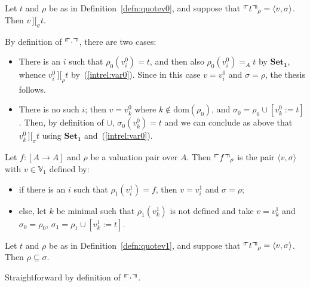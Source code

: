 \documentclass[numreferences]{kluwer}
\newcommand{\intII}{\,]\![}
\newcommand{\intrel}{\mathbin{\intII_{\rho}}}
\newcommand{\V}{{\mathbb V}}
\newcommand{\axiom}[1]{\ensuremath{\mathbf{#1}}}
\newcommand{\mlfnv}[2]{\ensuremath\ulcorner\!\!\ulcorner{#1}\urcorner\!\!\urcorner_{#2}}
\newcommand{\domain}{\ensuremath{\mathrm{dom}}}
\newcommand{\intrels}{\mathbin{\intII_{\sigma}}}
\begin{document}
\begin{article}
\begin{lemma}\label{quotev0corr}
Let $t$ and $\rho$ be as in Definition~\ref{defn:quotev0}, and suppose
that $\mlfnv{t}{\rho}=\langle v,\sigma\rangle$.  Then $v\intrels t$.
\end{lemma}
\begin{pf}
By definition of $\mlfnv{\cdot}{}$, there are two cases:
\begin{itemize}
\item There is an $i$ such that $\rho_0(v^0_i)=t$, and then also
$\rho_0(v^0_i)=_A t$ by \axiom{Set_1}, whence $v^0_i\intrel t$
by~(\ref{intrel:var0}).  Since in this case $v=v^0_i$ and
$\sigma=\rho$, the thesis follows.
\item There is no such $i$; then $v=v^0_k$ where $k\not\in\domain(\rho_0)$,
and $\sigma_0=\rho_0\cup[v^0_k:=t]$.  Then, by definition of $\cup$,
$\sigma_0(v^0_k)=t$ and we can conclude as above that $v^0_k\intrels t$
using \axiom{Set_1} and~(\ref{intrel:var0}).
\end{itemize}
\end{pf}

\begin{definition}\label{defn:quotev1}
Let $f:[A\to A]$ and $\rho$ be a valuation pair over $A$.  Then
$\mlfnv{f}{\rho}$ is the pair $\langle v,\sigma\rangle$ with $v\in\V_1$
defined by:
\begin{itemize}
\item if there is an $i$ such that $\rho_1(v^1_i)=f$, then $v=v^1_i$ and
$\sigma=\rho$;
\item else, let $k$ be minimal such that $\rho_1(v^1_k)$ is not defined
and take $v=v^1_k$ and $\sigma_0=\rho_0$, $\sigma_1=\rho_1\cup[v^1_k:=t]$.
\end{itemize}
\end{definition}

\begin{lemma}\label{quotev1incl}
Let $t$ and $\rho$ be as in Definition~\ref{defn:quotev1}, and suppose
that $\mlfnv{t}{\rho}=\langle v,\sigma\rangle$.  Then $\rho\subseteq\sigma$.
\end{lemma}
\begin{pf}
Straightforward by definition of $\mlfnv{\cdot}{}$.
\end{pf}


\end{article}
\end{document}
